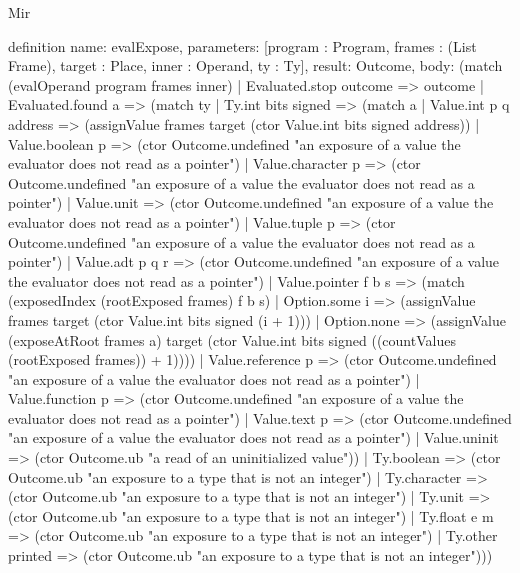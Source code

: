 \begin{lexlean}{Mir}
\begin{semanticmodule}
definition{
  name: evalExpose,
  parameters: [program : Program, frames : (List Frame), target : Place, inner : Operand, ty : Ty],
  result: Outcome,
  body: (match (evalOperand program frames inner)
    | Evaluated.stop outcome => outcome
    | Evaluated.found a => (match ty
      | Ty.int bits signed => (match a
        | Value.int p q address => (assignValue frames target (ctor Value.int bits signed address))
        | Value.boolean p => (ctor Outcome.undefined "an exposure of a value the evaluator does not read as a pointer")
        | Value.character p => (ctor Outcome.undefined "an exposure of a value the evaluator does not read as a pointer")
        | Value.unit => (ctor Outcome.undefined "an exposure of a value the evaluator does not read as a pointer")
        | Value.tuple p => (ctor Outcome.undefined "an exposure of a value the evaluator does not read as a pointer")
        | Value.adt p q r => (ctor Outcome.undefined "an exposure of a value the evaluator does not read as a pointer")
        | Value.pointer f b s => (match (exposedIndex (rootExposed frames) f b s)
          | Option.some i => (assignValue frames target (ctor Value.int bits signed (i + 1)))
          | Option.none => (assignValue (exposeAtRoot frames a) target (ctor Value.int bits signed ((countValues (rootExposed frames)) + 1))))
        | Value.reference p => (ctor Outcome.undefined "an exposure of a value the evaluator does not read as a pointer")
        | Value.function p => (ctor Outcome.undefined "an exposure of a value the evaluator does not read as a pointer")
        | Value.text p => (ctor Outcome.undefined "an exposure of a value the evaluator does not read as a pointer")
        | Value.uninit => (ctor Outcome.ub "a read of an uninitialized value"))
      | Ty.boolean => (ctor Outcome.ub "an exposure to a type that is not an integer")
      | Ty.character => (ctor Outcome.ub "an exposure to a type that is not an integer")
      | Ty.unit => (ctor Outcome.ub "an exposure to a type that is not an integer")
      | Ty.float e m => (ctor Outcome.ub "an exposure to a type that is not an integer")
      | Ty.other printed => (ctor Outcome.ub "an exposure to a type that is not an integer")))
}


\end{semanticmodule}
\end{lexlean}
